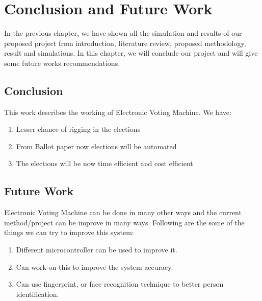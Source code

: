 \chapter{Conclusion and Future Work}
\label{chap5}
In the previous chapter, we have shown all the simulation and results of our proposed project from introduction, literature review, proposed methodology, result and simulations. In this chapter, we will conclude our project and will give some future works recommendations.
\section{Conclusion}
This work describes the working of Electronic Voting Machine. We have:
\begin{enumerate}
\item Lesser chance of rigging in the elections
%
\item From Ballot paper now elections will be automated
%
\item The elections will be now time efficient and cost efficient
%
\end{enumerate}


\section{Future Work}
Electronic Voting Machine can be done in many other ways and the current method/project can be improve in many ways. Following are the some of the things we can try to improve this system:
\begin{enumerate}
\item Different microcontroller can be used to improve it.
%
\item Can work on this to improve the system accuracy.
%
%
\item Can use fingerprint, or face recognition technique to better person identification.
\end{enumerate}

